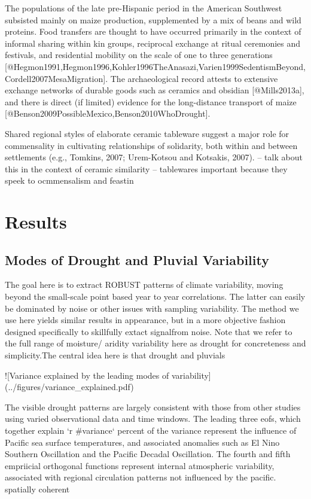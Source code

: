 \documentclass[fleqn,10pt]{wlscirep}
\begin{document}
The populations of the late pre-Hispanic period in the American Southwest subsisted mainly on maize production, supplemented by a mix of beans and wild proteins. Food transfers are thought to have occurred primarily in the context of informal sharing within kin groups, reciprocal exchange at ritual ceremonies and festivals, and residential mobility on the scale of one to three generations [@Hegmon1991,Hegmon1996,Kohler1996TheAnasazi,Varien1999SedentismBeyond,Cordell2007MesaMigration]. The archaeological record attests to extensive exchange networks of durable goods such as ceramics and obsidian [@Mills2013a], and there is direct (if limited) evidence for the long-distance transport of maize [@Benson2009PossibleMexico,Benson2010WhoDrought].


Shared
regional styles of elaborate ceramic tableware suggest a major role
for commensality in cultivating relationships of solidarity, both
within and between settlements (e.g., Tomkins, 2007; Urem-Kotsou
and Kotsakis, 2007). -- talk about this in the context of ceramic similarity -- tablewares important because they speek to ocmmensalism and feastin

\section*{Results}

\subsection*{Modes of Drought and Pluvial Variability}

The goal here is to extract ROBUST patterns of climate variability, moving beyond the small-scale point based year to year correlations. The latter can easily be dominated by noise or other issues with sampling variability. The method we use here yields similar results in appearance, but in a more objective fashion designed specifically to skillfully extact signalfrom noise.
Note that we refer to the full range of moisture/ aridity variability here as drought for concreteness and simplicity.The central idea here is that drought and pluvials

![Variance explained by the leading modes of variability](../figures/variance_explained.pdf)

The visible drought patterns are largely consistent with those from other studies using varied observational data and time windows. The leading three eofs, which together explain `r #variance` percent of the variance represent the influence of Pacific sea surface temperatures, and associated anomalies such as El Nino Southern Oscillation and the Pacific Decadal Oscillation. The fourth and fifth empriicial orthogonal functions represent internal atmospheric variability, associated with regional circulation patterns not influenced by the pacific. spatially coherent
\end{document}
